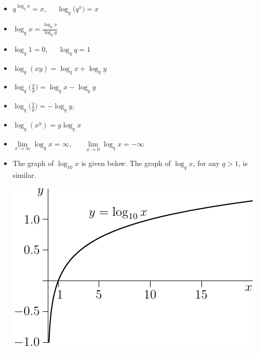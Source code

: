 \begin{itemize}
\item   $q^{\log_q x}=x$,\ \ \
            $\log_q \big(q^x\big)=x$
\item   $\log_q x=\frac{\log_p x}{\log_p q}$
\item  $\log_q 1=0$,\ \ \
          $\log_q q=1$
\item $\log_q(xy)=\log_q x+\log_q y$
\item $\log_q\big(\frac{x}{y}\big)=\log_q x-\log_q y$
\item $\log_q\big(\frac{1}{y}\big)=-\log_q y$,
\item $\log_q(x^y)=y\log_q x$
\item $\lim\limits_{x\rightarrow\infty}\log_q x=\infty$, \ \ \
           $\lim\limits_{x\rightarrow0}\log_q x=-\infty$
\item The graph of $\log_{10} x$ is given below. The graph of  $\log_q x$,
for any $q>1$, is similar.

\begin{center}
\includegraphics{logGraph10}
\end{center}

\end{itemize}



